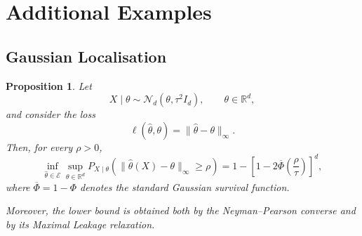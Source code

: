 \documentclass[11pt]{article}
\newtheorem{proposition}[theorem]{Proposition}
\theoremstyle{definition}
\theoremstyle{remark}
\newcommand{\1}{\boldsymbol{1}}
\begin{document}
\section{Additional Examples}
\subsection{Gaussian Localisation}
\label{app:gaussianLocalisation}
\begin{proposition}
\label{prop:gaussianLinfty}
Let
\[
X\mid\theta
\sim
\mathcal N_d(\theta,\tau^2 I_d),
\qquad
\theta\in\mathbb R^d,
\]
and consider the loss
\[
\ell(\widehat\theta,\theta)
=
\|\widehat\theta-\theta\|_\infty.
\]
Then, for every $\rho>0$,
\begin{equation}
\inf_{\widehat\theta\in\mathcal E}
\sup_{\theta\in\mathbb R^d}
P_{X\mid\theta}
\left(
\|\widehat\theta(X)-\theta\|_\infty\geq\rho
\right)
=
1-
\left[
1-2\overline\Phi\left(\frac{\rho}{\tau}\right)
\right]^d,
\label{eq:gaussianLinftyExactRisk}
\end{equation}
where $\overline\Phi=1-\Phi$ denotes the standard Gaussian survival
function.

Moreover, the lower bound is obtained both by the
Neyman--Pearson converse and by its Maximal Leakage relaxation.
\end{proposition}
\end{document}

